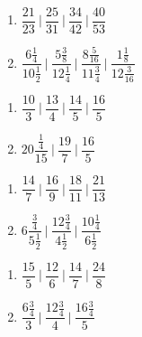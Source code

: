 
\begin{multicols}{2}
\begin{enumerate}[$(1)$]
\item $\dfrac{21}{23}~\bigg|~ \dfrac{25}{31} ~\bigg|~ \dfrac{34}{42}~\bigg|~ 
\dfrac{40}{53}$  
\item$\dfrac{6 \frac{1}{4}}{10\frac{1}{2}}~\Bigg|~  
               \dfrac{5 \frac{3}{8}}{12\frac{1}{4}}~\Bigg|~
               \dfrac{8\frac{5}{16}}{11\frac{3}{4}}~\Bigg| ~
               \dfrac{1\frac{1}{8}}{12\frac{3}{16}}$
\end{enumerate}
\end{multicols}


\begin{multicols}{2}
\begin{enumerate}[$(1)$]
\item $\dfrac{10}{3}~\bigg|~ \dfrac{13}{4} ~\bigg|~ \dfrac{14}{5}~\bigg|~ 
\dfrac{16}{5}$  
\item $20\dfrac{\frac{1}{4}}{15}~\bigg|~ \dfrac{19}{7}
               ~\bigg|~ \dfrac{16}{5}$
\end{enumerate}
\end{multicols}

\newpage
{}

\begin{multicols}{2}
\begin{enumerate}[$(1)$]
\item $\dfrac{14}{7}~\bigg|~ \dfrac{16}{9} ~\bigg|~ \dfrac{18}{11}~\bigg|~ 
\dfrac{21}{13}$  
\item
$6\dfrac{\frac{3}{4}}{5\frac{1}{2}}~\bigg|~ \dfrac{12\frac{3}{4}}{4\frac{1}{2}} 
               ~\bigg|~ \dfrac{10\frac{1}{4}}{6\frac{1}{2}}$
\end{enumerate}
\end{multicols}


\begin{multicols}{2}
\begin{enumerate}[$(1)$]
\item $\dfrac{15}{5}~\bigg|~ \dfrac{12}{6} ~\bigg|~ \dfrac{14}{7}~\bigg|~ 
\dfrac{24}{8}$ 
\item $ \dfrac{6\frac{3}{4}}{3}~\bigg|~ \dfrac{12\frac{3}{4}}{4} ~\bigg|~\dfrac{16\frac{3}{4}}{5}$ 
\end{enumerate}
\end{multicols}

